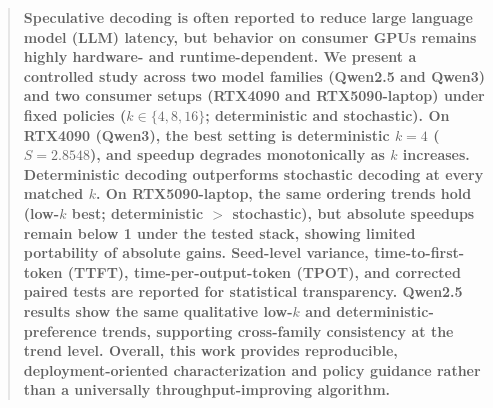 \begin{abstract}
{\bfseries\boldmath
Speculative decoding is often reported to reduce large language model (LLM)
latency, but behavior on consumer GPUs remains highly hardware- and
runtime-dependent. We present a controlled study across two model families
(Qwen2.5 and Qwen3) and two consumer setups (RTX4090 and RTX5090-laptop)
under fixed policies ($k\in\{4,8,16\}$; deterministic and stochastic).
On RTX4090 (Qwen3), the best setting is deterministic $k{=}4$
($S{=}2.8548$), and speedup degrades monotonically as $k$ increases.
Deterministic decoding outperforms stochastic decoding at every matched $k$.
On RTX5090-laptop, the same ordering trends hold (low-$k$ best; deterministic
$>$ stochastic), but absolute speedups remain below 1 under the tested stack,
showing limited portability of absolute gains. Seed-level variance,
time-to-first-token (TTFT), time-per-output-token (TPOT), and corrected paired
tests are reported for statistical transparency. Qwen2.5 results show the same
qualitative low-$k$ and deterministic-preference trends, supporting
cross-family consistency at the trend level. Overall, this work provides
reproducible, deployment-oriented characterization and policy guidance rather
than a universally throughput-improving algorithm.
}
\end{abstract}